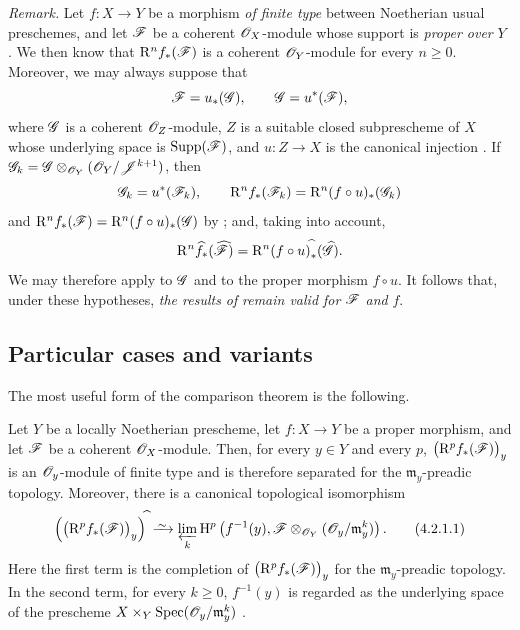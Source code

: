\begin{env}[4.1.10]
\label{III.4.1.10}
\emph{Remark.}
Let $f:X\to Y$ be a morphism \emph{of finite type} between Noetherian usual
preschemes, and let $\mathscr{F}$ be a coherent $\mathscr{O}_X$-module whose
support is \emph{proper over} $Y$ .
We then know  that $\mathrm{R}^n f_*(\mathscr{F})$ is a coherent
$\mathscr{O}_Y$-module for every $n\geq0$.
Moreover, we may always suppose that
\[
  \mathscr{F}=u_*(\mathscr{G}),
  \qquad
  \mathscr{G}=u^*(\mathscr{F}),
\]
where $\mathscr{G}$ is a coherent $\mathscr{O}_Z$-module, $Z$ is a suitable
closed subprescheme of $X$ whose underlying space is
$\operatorname{Supp}(\mathscr{F})$, and $u:Z\to X$ is the canonical injection
.
If $\mathscr{G}_k
=
\mathscr{G}\otimes_{\mathscr{O}_Y}
(\mathscr{O}_Y/\mathscr{J}^{k+1})$,
then
\[
  \mathscr{G}_k=u^*(\mathscr{F}_k),
  \qquad
  \mathrm{R}^n f_*(\mathscr{F}_k)
  =
  \mathrm{R}^n(f\circ u)_*(\mathscr{G}_k)
\]
and $\mathrm{R}^n f_*(\mathscr{F})
=
\mathrm{R}^n(f\circ u)_*(\mathscr{G})$
by ; and, taking  into account,
\[
  \mathrm{R}^n\widehat{f}_*(\widehat{\mathscr{F}})
  =
  \mathrm{R}^n(f\circ u)^{\widehat{\,}}_*(\widehat{\mathscr{G}}).
\]
We may therefore apply  to $\mathscr{G}$ and to the proper
morphism $f\circ u$.
It follows that, under these hypotheses, \emph{the results of}
 \emph{remain valid for} $\mathscr{F}$ \emph{and} $f$.
\end{env}


\subsection{Particular cases and variants}
\label{subsection:III.4.2}

The most useful form of the comparison theorem  is
the following.

\begin{proposition}[4.2.1]
\label{III.4.2.1}
Let $Y$ be a locally Noetherian prescheme, let $f:X\to Y$ be a
proper morphism, and let $\mathscr{F}$ be a coherent $\mathscr{O}_X$-module.
Then, for every $y\in Y$ and every $p$, $\bigl(\mathrm{R}^p f_*(\mathscr{F})\bigr)_y$
is an $\mathscr{O}_y$-module of finite type and is therefore separated
for the $\mathfrak{m}_y$-preadic topology.
Moreover, there is a canonical topological isomorphism
\[
  \Bigl(\bigl(\RR^p f_*(\sh{F})\bigr)_y\Bigr)^{\widehat{\,}}
  \isoto
  \varprojlim_k
  \HH^p\left(
    f^{-1}(y),
    \sh{F}\otimes_{\sh{O}_Y}
    (\sh{O}_y/\mathfrak{m}_y^k)
  \right).
  \tag{4.2.1.1}
  \label{III.4.2.1.1}
\]
Here the first term is the completion of
$\bigl(\mathrm{R}^p f_*(\mathscr{F})\bigr)_y$ for the
$\mathfrak{m}_y$-preadic topology.
In the second term, for every $k\geq0$, $f^{-1}(y)$ is regarded as
the underlying space of the prescheme $X\times_Y\operatorname{Spec}(\mathscr{O}_y/\mathfrak{m}_y^k)$
.
\end{proposition}

